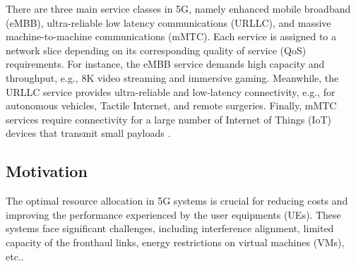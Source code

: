 \documentclass[lettersize,journal]{IEEEtran}
\begin{document}
There are three main service classes in 5G, namely enhanced mobile broadband (eMBB), ultra-reliable low latency communications (URLLC), and massive machine-to-machine communications (mMTC). Each service is assigned to a network slice depending on its corresponding quality of service (QoS) requirements.
For instance, the eMBB service demands high capacity and throughput,  e.g., 8K video streaming and immersive gaming. Meanwhile, the URLLC service provides ultra-reliable and low-latency connectivity, e.g., for autonomous vehicles, Tactile Internet, and remote surgeries. Finally, mMTC services require connectivity for a large number of Internet of Things (IoT) devices that transmit small payloads \cite{dogra2020survey,alsenwi2021intelligent,SL}.
\vspace{-3mm}
\subsection{Motivation}
\vspace{-1mm}
The optimal resource allocation in 5G systems is crucial for reducing costs and improving the performance experienced by the user equipments (UEs).  These systems face significant challenges, including interference alignment, limited capacity of the fronthaul links, energy restrictions on virtual machines (VMs), etc.\cite{lee2018dynamic,SystemCostMinimization, setayesh2020joint}.
\end{document}
